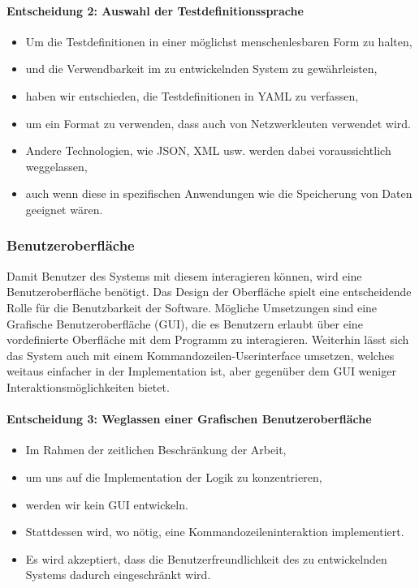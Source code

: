\documentclass[]{subfiles}
\begin{document}
		\paragraph{Entscheidung 2: Auswahl der Testdefinitionssprache}
		\begin{itemize}
			\item Um die Testdefinitionen in einer möglichst menschenlesbaren Form zu halten,
			\item und die Verwendbarkeit im zu entwickelnden System zu gewährleisten,
			\item haben wir entschieden, die Testdefinitionen in YAML zu verfassen,
			\item um ein Format zu verwenden, dass auch von Netzwerkleuten verwendet wird.
			\item Andere Technologien, wie JSON, XML usw. werden dabei voraussichtlich weggelassen,
			\item auch wenn diese in spezifischen Anwendungen wie die Speicherung von Daten geeignet wären.
		\end{itemize}
		\newpage

		\subsubsection{Benutzeroberfläche}
		Damit Benutzer des Systems mit diesem interagieren können, wird eine Benutzeroberfläche benötigt.
		Das Design der Oberfläche spielt eine entscheidende Rolle für die Benutzbarkeit der Software. 
		Mögliche Umsetzungen sind eine Grafische Benutzeroberfläche (GUI), die es Benutzern erlaubt über eine vordefinierte Oberfläche mit dem Programm zu interagieren.
		Weiterhin lässt sich das System auch mit einem Kommandozeilen-Userinterface umsetzen, welches weitaus einfacher in der Implementation ist, aber gegenüber dem GUI weniger Interaktionsmöglichkeiten bietet.

		\paragraph{Entscheidung 3: Weglassen einer Grafischen Benutzeroberfläche}
		\begin{itemize}
			\item Im Rahmen der zeitlichen Beschränkung der Arbeit,
			\item um uns auf die Implementation der Logik zu konzentrieren,
			\item werden wir kein GUI entwickeln.
			\item Stattdessen wird, wo nötig, eine Kommandozeileninteraktion implementiert.
			\item Es wird akzeptiert, dass die Benutzerfreundlichkeit des zu entwickelnden Systems dadurch eingeschränkt wird.
		\end{itemize}
\end{document}
